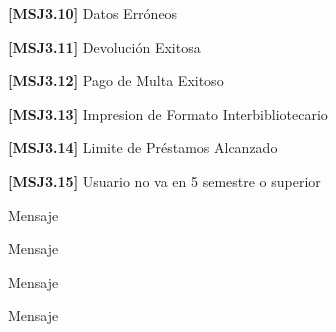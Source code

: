 	\begin{Citemize}
	\item {\bf [MSJ3.10]} Datos Erróneos
	\end{Citemize}
	
	\begin{Citemize}
	\item {\bf [MSJ3.11]} Devolución Exitosa
	\end{Citemize}
	
	\begin{Citemize}
	\item {\bf [MSJ3.12]} Pago de Multa Exitoso
	\end{Citemize}
	
	\begin{Citemize}
	\item {\bf [MSJ3.13]} Impresion de Formato Interbibliotecario
	\end{Citemize}
	
	\begin{Citemize}
	\item {\bf [MSJ3.14]} Limite de Préstamos Alcanzado
	\end{Citemize}
	
	\begin{Citemize}
	\item {\bf [MSJ3.15]} Usuario no va en 5 semestre o superior
	\end{Citemize}
	
\begin{Citemize}
	\item Mensaje 
\end{Citemize}

\begin{Citemize}	
	\item Mensaje 
\end{Citemize}

\begin{Citemize}	
	\item Mensaje 
\end{Citemize}

\begin{Citemize}	
	\item Mensaje 
\end{Citemize}

